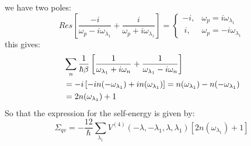 \documentclass{article}
\begin{document}
we have two poles:
\begin{equation}
    Res\left[ \frac{-i}{\omega_p - i\omega_{\lambda_1}} + \frac{i}{\omega_p+i\omega_{\lambda_1}} \right] =
    \begin{cases}
        -i, & \omega_p = i\omega_{\lambda_1} \\
        \ i, & \omega_p = -i \omega_{\lambda_1}
    \end{cases}
\end{equation}
this gives:
\begin{align}
    &\sum_n \frac{1}{\hbar\beta} \left[ \frac{1}{\omega_{\lambda_1}+i\omega_n} + \frac{1}{\omega_{\lambda_1}-i\omega_n} \right] \notag \\
    &= -i \left[ -i n(-\omega_{\lambda_1}) + in(\omega_{\lambda_1}) \right] = n(\omega_{\lambda_1}) - n(-\omega_{\lambda_1}) \notag \\
    &= 2n(\omega_{\lambda_1}) + 1
\end{align}
So that the expression for the self-energy is given by:
\begin{equation}
    \Sigma_{qv} = -\frac{12}{\hbar} \sum_{\lambda_1} V^{(4)}(-\lambda,-\lambda_1,\lambda,\lambda_1) \left[ 2n(\omega_{\lambda_1}) + 1 \right]
\end{equation}
\end{document}
